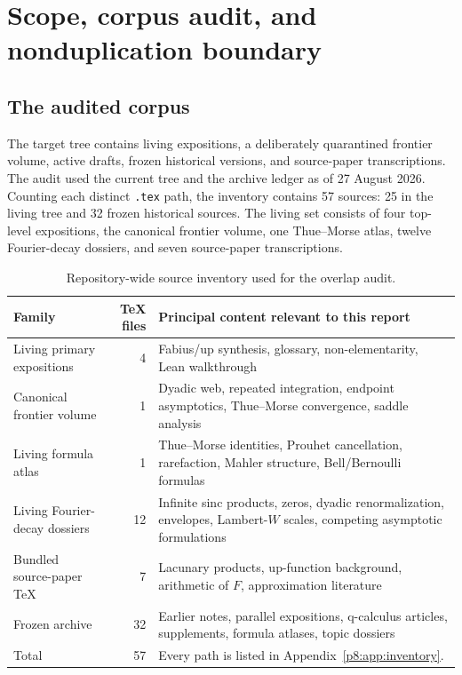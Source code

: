 \documentclass[11pt]{article}
\numberwithin{equation}{section}
\theoremstyle{definition}
\theoremstyle{remark}
\begin{document}
\clearpage

\section{Scope, corpus audit, and nonduplication boundary}

\subsection{The audited corpus}

The target tree contains living expositions, a deliberately quarantined frontier volume, active drafts, frozen historical versions, and source-paper transcriptions. The audit used the current tree and the archive ledger as of 27 August 2026. Counting each distinct \texttt{.tex} path, the inventory contains 57 sources: 25 in the living tree and 32 frozen historical sources. The living set consists of four top-level expositions, the canonical frontier volume, one Thue--Morse atlas, twelve Fourier-decay dossiers, and seven source-paper transcriptions.

\begin{table}[htbp]
\centering
\caption{Repository-wide source inventory used for the overlap audit.}
\label{p8:tab:inventory}
\begin{tabularx}{\textwidth}{@{}l r X@{}}
\toprule
Family & TeX files & Principal content relevant to this report \\
\midrule
Living primary expositions & 4 & Fabius/up synthesis, glossary, non-elementarity, Lean walkthrough \\
Canonical frontier volume & 1 & Dyadic web, repeated integration, endpoint asymptotics, Thue--Morse convergence, saddle analysis \\
Living formula atlas & 1 & Thue--Morse identities, Prouhet cancellation, rarefaction, Mahler structure, Bell/Bernoulli formulas \\
Living Fourier-decay dossiers & 12 & Infinite sinc products, zeros, dyadic renormalization, envelopes, Lambert-$W$ scales, competing asymptotic formulations \\
Bundled source-paper TeX & 7 & Lacunary products, up-function background, arithmetic of $F$, approximation literature \\
Frozen archive & 32 & Earlier notes, parallel expositions, q-calculus articles, supplements, formula atlases, topic dossiers \\
\midrule
Total & 57 & Every path is listed in Appendix~\ref{p8:app:inventory}. \\
\bottomrule
\end{tabularx}
\end{table}
\end{document}
